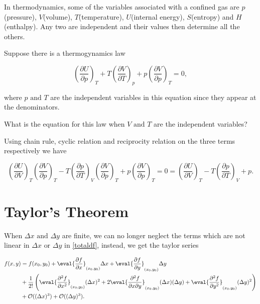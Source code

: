 \documentclass[english,a4paper,12pt]{report}
\begin{document}
{In thermodynamics, some of the variables associated with a confined gas are \(p\)(pressure), \(V\)(volume), \(T\)(temperature), \(U\)(internal energy), \(S\)(entropy) and \(H\)(enthalpy). Any two are independent and their values then determine all the others. 

Suppose there is a thermogynamics law 

\begin{equation}
	\left( \frac{\partial U}{\partial p}  \right)_{T} + T \left( \frac{\partial V}{\partial T}  \right)_{p} + p \left( \frac{\partial V}{\partial p}  \right)_{T} = 0, 
\end{equation}

where \(p \text { and } T\) are the independent variables in this equation since they appear at the denominators. 

What is the equation for this law when \(V \text { and } T\) are the independent variables? 
}
{Using chain rule, cyclic relation and reciprocity relation on the three terms respectively we have 

\begin{equation}
	\left( \frac{\partial U}{\partial V}  \right)_{T} \left( \frac{\partial V}{\partial p}  \right)_{T} - T \left( \frac{\partial p}{\partial T}  \right)_{V}\left( \frac{\partial V}{\partial p}  \right)_{T} + p \left( \frac{\partial V}{\partial p}  \right)_{T} = 0 = \left( \frac{\partial U}{\partial V}  \right)_{T} - T\left( \frac{\partial p}{\partial T}  \right)_{V} + p .  
\end{equation}

} 


\section{Taylor's Theorem}
When \(\Delta x \text { and }  \Delta y\) are finite, we can no longer neglect the terms which are not linear in \(\Delta x \text { or } \Delta y\) in \cref{totaldf}, instead, we get the taylor series 

\begin{equation}
    \begin{aligned}
    f(x,y) &= f(x_0 ,y_0 ) + \eval{\frac{\partial f}{\partial x}}_{(x_0 ,y_0 )}  \Delta x + \eval{\frac{\partial f}{\partial y}}_{(x_0 ,y_0 )} \Delta y \\ &+ \frac{1}{2!} \left( \eval{\frac{\partial^2 f}{\partial x^2}}_{(x_0 ,y_0 )}  (\Delta x)^2 + 2\eval{\frac{\partial^2 f}{\partial x \partial y}}_{(x_0 ,y_0 )}(\Delta x)(\Delta y) + \eval{\frac{\partial^2 f}{\partial y^2}}_{(x_0 ,y_0 )} (\Delta y)^2 \right) \\ &+ \mathcal{O}((\Delta x)^3 ) + \mathcal{O}((\Delta y)^3 ).        
    \end{aligned}
\end{equation}
\end{document}

